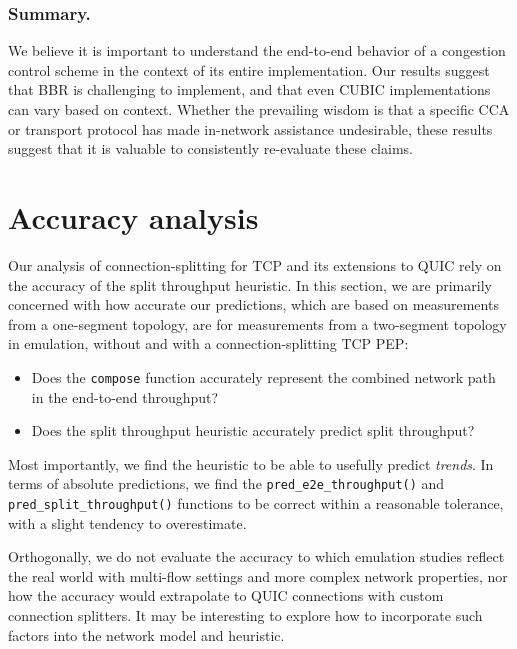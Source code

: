 \subsubsection{Summary.}

We believe it is important to understand the end-to-end behavior of a congestion
control scheme in the context of its entire implementation.
Our results suggest that BBR is challenging to implement, and that even CUBIC
implementations can vary based on context. Whether the prevailing wisdom is
that a specific CCA or transport protocol has made in-network assistance
undesirable, these results suggest that it is valuable to consistently
re-evaluate these claims.

\section{Accuracy analysis}
\label{sec:splitting:accuracy}



Our analysis of connection-splitting for TCP and its extensions to QUIC rely on
the accuracy of the split throughput heuristic. In this section, we are
primarily concerned with how accurate our predictions, which are based on
measurements from a one-segment topology, are for measurements from a
two-segment topology in emulation, without and with a connection-splitting TCP
PEP:
\begin{itemize}[noitemsep]
\item Does the \texttt{compose} function accurately represent the combined
 network path in the end-to-end throughput?
\item Does the split throughput heuristic accurately predict split throughput?
\end{itemize}

\noindent Most importantly, we find the heuristic to be able to usefully
 predict \textit{trends}.
 In terms of absolute predictions, we find the \texttt{pred\_e2e\_throughput()}
 and \texttt{pred\_split\_throughput()} functions to be correct within a
 reasonable tolerance, with a slight tendency to overestimate.

Orthogonally, we do not evaluate the accuracy to which emulation studies reflect
the real world with multi-flow settings and more complex network properties,
nor how the accuracy would extrapolate to QUIC connections with custom
connection splitters. It may be interesting to explore how to incorporate
such factors into the network model and heuristic.

